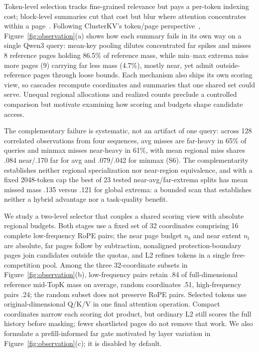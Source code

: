 \documentclass[conference,9pt,letterpaper]{IEEEtran}
\begin{document}
Token-level selection tracks fine-grained relevance but pays a per-token indexing cost; block-level summaries cut that cost but blur where attention concentrates within a page~\cite{asynctls}. Following ClusterKV's token/page perspective~\cite{clusterkv}, Figure~\ref{fig:observation}(a) shows how each summary fails in its own way on a single Qwen3 query: mean-key pooling dilutes concentrated far spikes and misses 8 reference pages holding 86.5\% of reference mass, while min--max extrema miss more pages (9) carrying far less mass (4.7\%), mostly near, yet admit outside-reference pages through loose bounds. Each mechanism also ships its own scoring view, so cascades recompute coordinates and summaries that one shared set could serve. Unequal regional allocations and realized counts preclude a controlled comparison but motivate examining how scoring and budgets shape candidate access.

The complementary failure is systematic, not an artifact of one query: across 128 correlated observations from four sequences, avg misses are far-heavy in 65\% of queries and minmax misses near-heavy in 61\%, with mean regional miss shares .084 near/.170 far for avg and .079/.042 for minmax (S6). The complementarity establishes neither regional specialization nor near-region equivalence, and with a fixed 2048-token cap the best of 23 tested near-avg/far-extrema splits has mean missed mass .135 versus .121 for global extrema: a bounded scan that establishes neither a hybrid advantage nor a task-quality benefit.

We study a two-level selector that couples a shared scoring view with absolute regional budgets. Both stages use a fixed set of 32 coordinates comprising 16 complete low-frequency RoPE pairs; the near page budget $n_b$ and near extent $n_l$ are absolute, far pages follow by subtraction, nonaligned protection-boundary pages join candidates outside the quotas, and L2 refines tokens in a single free-competition pool. Among the three 32-coordinate subsets in Figure~\ref{fig:observation}(b), low-frequency pairs retain .84 of full-dimensional reference mid-TopK mass on average, random coordinates .51, high-frequency pairs .24; the random subset does not preserve RoPE pairs. Selected tokens use original-dimensional Q/K/V in one final attention operation. Compact coordinates narrow each scoring dot product, but ordinary L2 still scores the full history before masking; fewer shortlisted pages do not remove that work. We also formulate a prefill-informed far gate motivated by layer variation in Figure~\ref{fig:observation}(c); it is disabled by default.
\end{document}
